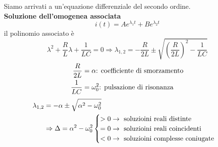 \documentclass{article}
\begin{document}
Siamo arrivati a un'equazione differenziale del secondo ordine.\\
    \textbf{Soluzione dell'omogenea associata}
    \[
        i(t) = Ae^{\lambda_1t} + B e^{\lambda_2t}
    \]
    il polinomio associato è 
    \[
        \lambda^2 + \frac{R}{L} \lambda + \frac{1}{LC} = 0 \Rightarrow \lambda_{1,2} = - \frac{R}{2L} \pm \sqrt{\left(\frac{R}{2L}\right)^2 - \frac{1}{LC}}
    \]
    \begin{align*}
        \frac{R}{2L} &= \alpha \text{: coefficiente di smorzamento}\\
        \frac{1}{LC} &= \omega^2_0 \text{: pulsazione di risonanza}
    \end{align*}
    \begin{align*}
        \lambda_{1,2} &= - \alpha \pm \sqrt{\alpha^2 - \omega^2_0}\\
        &\Rightarrow \Delta = \alpha^2 - \omega^2_0 
        \begin{cases}
            >0 \rightarrow \text{ soluzioini reali distinte}\\
            =0 \rightarrow \text{ soluzioini reali coincidenti}\\
            <0 \rightarrow \text{ soluzioini complesse coniugate}
        \end{cases}
    \end{align*}
\end{document}
